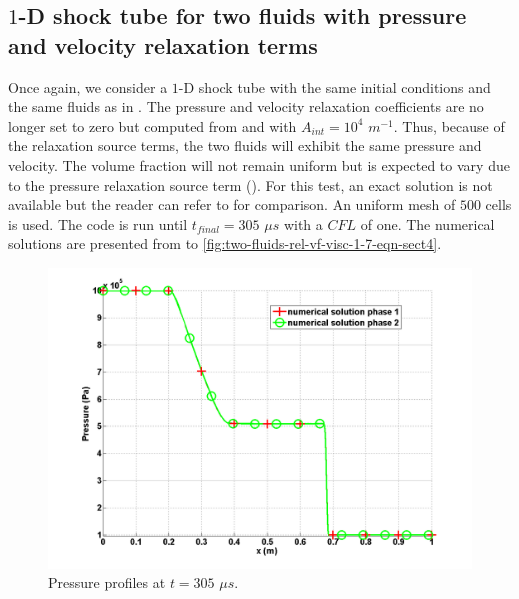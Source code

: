 \subsection{$1$-D shock tube for two fluids with pressure and velocity relaxation terms}\label{sec:1d-2-phases-rel-7-eq-sct4}
Once again, we consider a $1$-D shock tube with the same initial conditions and the same fluids as in . The pressure and velocity relaxation coefficients are no longer set to zero but computed from  and  with $A_{int} =  10^4$ $m^{-1}$. Thus, because of the relaxation source terms, the two fluids will exhibit the same pressure and velocity. The volume fraction will not remain uniform but is expected to vary due to the pressure relaxation source term (). For this test, an exact solution is not available but the reader can refer to \cite{Saurel_2007} for comparison. An uniform mesh of $500$ cells is used. The code is run until $t_{final} = 305$ $\mu s$ with a $CFL$ of one. The numerical solutions are presented from  to \ref{fig:two-fluids-rel-vf-visc-1-7-eqn-sect4}.
%
\begin{figure}[H]
\centering
\includegraphics[width=\textwidth]{figures/SEM/relaxation_two_phases_pressure.png}
\caption{Pressure profiles at $t=305$ $\mu s$.}
\label{fig:two-fluids-rel-press-7-eqn-sect4}
\end{figure}
%
